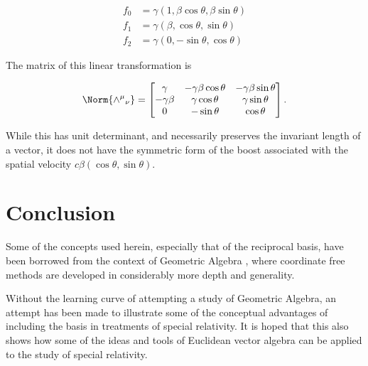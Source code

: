 \begin{align}\label{eqn:gramSchmidtLorentz:820}
f_0 &= \gamma ( 1, \beta \cos\theta, \beta\sin\theta ) \\
f_1 &= \gamma ( \beta, \cos\theta, \sin\theta ) \\
f_2 &= \gamma ( 0, -\sin\theta, \cos\theta )
\end{align}

The matrix of this linear transformation is

\begin{equation}\label{eqn:gramSchmidtLorentz:840}
\Norm{ {\wedge^\mu}_\nu } =
\begin{bmatrix}
\gamma & - \gamma \beta \cos\theta & - \gamma \beta \sin\theta \\
-\gamma \beta & \gamma \cos\theta & \gamma \sin\theta \\
0 & -\sin\theta & \cos\theta
\end{bmatrix}.
\end{equation}

While this has unit determinant, and necessarily preserves the invariant length of a vector, it does not have the symmetric form of the boost associated with the spatial velocity $c \beta (\cos\theta, \sin\theta)$.


\section{Conclusion}

Some of the concepts used herein, especially that of the reciprocal basis, have been borrowed from the context of Geometric Algebra
\citep{doran2003gap}
, where coordinate free methods are developed in considerably more depth and generality.

Without the learning curve of attempting a study of Geometric Algebra, an attempt has been made to illustrate some of the conceptual advantages of including the basis in treatments of special relativity.  It is hoped that this also shows how some of the ideas and tools of Euclidean vector algebra can be applied to the study of special relativity.

\EndArticle
